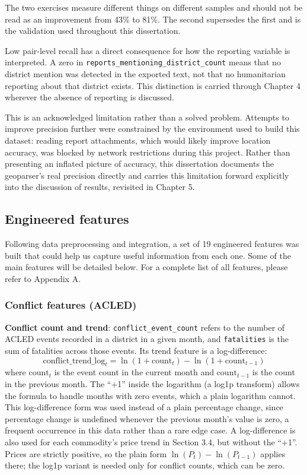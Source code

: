 \documentclass[12pt,a4paper]{article}
\begin{document}
The two exercises measure different things on different samples and should not be read as an improvement from 43\% to 81\%. The second supersedes the first and is the validation used throughout this dissertation.

Low pair-level recall has a direct consequence for how the reporting variable is interpreted. A zero in \texttt{reports\_mentioning\_district\_count} means that no district mention was detected in the exported text, not that no humanitarian reporting about that district exists. This distinction is carried through Chapter 4 wherever the absence of reporting is discussed.

This is an acknowledged limitation rather than a solved problem. Attempts to improve precision further were constrained by the environment used to build this dataset: reading report attachments, which would likely improve location accuracy, was blocked by network restrictions during this project. Rather than presenting an inflated picture of accuracy, this dissertation documents the geoparser's real precision directly and carries this limitation forward explicitly into the discussion of results, revisited in Chapter 5.

\subsection{Engineered features}

Following data preprocessing and integration, a set of 19 engineered features was built that could help us capture useful information from each one. Some of the main features will be detailed below. For a complete list of all features, please refer to Appendix A.

\subsubsection{Conflict features (ACLED)}

\textbf{Conflict count and trend}: \texttt{conflict\_event\_count} refers to the number of ACLED events recorded in a district in a given month, and \texttt{fatalities} is the sum of fatalities across those events. Its trend feature is a log-difference:
\[
\text{conflict\_trend\_log}_t = \ln(1+\text{count}_t) - \ln(1+\text{count}_{t-1})
\]
where $\text{count}_t$ is the event count in the current month and $\text{count}_{t-1}$ is the count in the previous month. The ``+1'' inside the logarithm (a log1p transform) allows the formula to handle months with zero events, which a plain logarithm cannot. This log-difference form was used instead of a plain percentage change, since percentage change is undefined whenever the previous month's value is zero, a frequent occurrence in this data rather than a rare edge case. A log-difference is also used for each commodity's price trend in Section 3.4, but without the ``+1''. Prices are strictly positive, so the plain form $\ln(P_t) - \ln(P_{t-1})$ applies there; the log1p variant is needed only for conflict counts, which can be zero.
\end{document}
